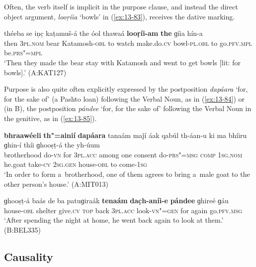 Often, the verb itself is implicit in the purpose clause, and instead the direct object argument, \textit{looṛíia} `bowls' in (\ref{ex:13-83}), receives the dative marking.

\begin{exe}
\ex
\label{ex:13-83}
\gll théeba se iṇc̣ kaṭamuš-á the óol thawaá \textbf{looṛíi-am} \textbf{the} ɡíia hín-a \\
then \textsc{3pl.nom} bear Katamosh-\textsc{obl} to watch  make.do.\textsc{cv} bowl-\textsc{pl.obl} to go.\textsc{pfv.mpl} be.\textsc{prs"=mpl} \\
\glt `Then they made the bear stay with Katamosh and went to get bowls [lit: for bowls].' (A:KAT127) 
\end{exe}

Purpose is also quite often explicitly expressed by the postposition \textit{dapáara} `for, for the sake of' (a Pashto loan) following the Verbal Noun, as in (\ref{ex:13-84}) or (in B), the postposition \textit{pándee} `for, for the sake of' following the Verbal Noun in the genitive, as in (\ref{ex:13-85}).

\begin{exe}
\ex
\label{ex:13-84}
\gll \textbf{bhraawéeli} \textbf{th"=ainií} \textbf{dapáara} tanaám maǰí áak qabúl th-áan-u ki ma bhíiru ɡhin-í thíi ɡhooṣṭ-á the yh-úum \\
brotherhood do-\textsc{vn} for \textsc{3pl.acc} among one consent do-\textsc{prs"=msg} \textsc{comp} \textsc{1sg.nom} he.goat take-\textsc{cv} \textsc{2sg.gen}  house-\textsc{obl} to come-\textsc{1sg} \\
\glt `In order to form a~brotherhood, one of them agrees to bring a~male goat to the other person's house.' (A:MIT013)

\ex
\label{ex:13-85}
\gll ɡhooṣṭ-á baás de ba patuɡiraák \textbf{tenaám} \textbf{dac̣h-aníi-e} \textbf{pándee} ɡhireé ɡáu \\
house-\textsc{obl}  shelter give.\textsc{cv} \textsc{top} back \textsc{3pl.acc}  look-\textsc{vn"=gen} for again go.\textsc{pfv.msg} \\
\glt `After spending the night at home, he went back again to look at them.' (B:BEL335)
\end{exe}

\subsection{Causality}
\label{subsec:13-4-3}

